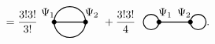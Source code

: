 \begin{example}
\begin{align*}
\begin{tikzpicture}[baseline=-1mm]
    \end{tikzpicture} \\
    &= \frac{3!3!}{3!}
    \begin{tikzpicture}[baseline=-1mm]
      \draw[thick] (0, 0) node at (-0.2, 0.3) {$\Psi_1$} -- (1, 0) node at (1.2, 0.3) {$\Psi_2$};
      \draw[thick] (0, 0) arc (180:0:.5);
      \draw[thick] (0, 0) arc (-180:0:.5);
      \draw[fill=black] (0, 0) circle (2pt);
      \draw[fill=black] (1, 0) circle (2pt);
    \end{tikzpicture}
    + \frac{3! 3!}{4} \ \
    \begin{tikzpicture}[baseline=-1mm]
      \draw[thick] (0, 0) node at (0.2, 0.3) {$\Psi_1$} -- (1, 0) node at (0.8, .3) {$\Psi_2$};
      \draw[thick] (-.25, 0) circle (2.5mm);
      \draw[thick] (1.25, 0) circle (2.5mm);
      \draw[fill=black] (0, 0) circle (2pt);
      \draw[fill=black] (1, 0) circle (2pt);
    \end{tikzpicture}.
  \end{align*}
\end{example}

